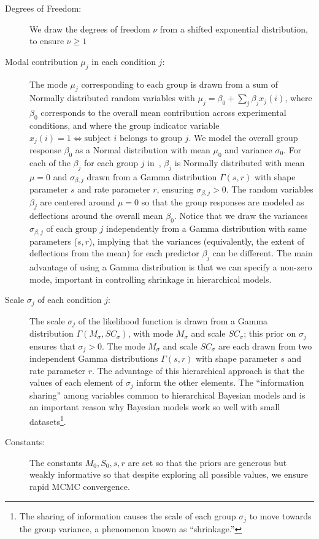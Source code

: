 \begin{description}
    \item[Degrees of Freedom:] We draw the degrees of freedom $\nu$ from a shifted exponential distribution, to ensure $\nu \geq 1$
    \item[Modal contribution $\mu_j$ in each condition $j$:] The mode $\mu_j$ corresponding to each group is drawn from a sum of Normally distributed random variables with $\mu_j = \beta_0 + \sum_j \beta_j x_j(i)$, where $\beta_0$ corresponds to the overall mean contribution across experimental conditions, and where the group indicator variable $x_j(i)=1 \iff \text{subject } i \text{ belongs to group } j$. We model the overall group response $\beta_0$ as a Normal distribution with mean $\mu_0$ and variance $\sigma_0$. For each of the $\beta_j$ for each group $j$ in~, $\beta_j$ is Normally distributed with mean $\mu=0$ and $\sigma_{\beta, j}$ drawn from a Gamma distribution $\Gamma(s,r)$ with shape parameter $s$ and rate parameter $r$, ensuring $\sigma_{\beta, j} > 0$. 
    The random variables $\beta_j$ are centered around $\mu=0$ so that the group responses are modeled as deflections around the overall mean $\beta_0$. Notice that we draw the variances $\sigma_{\beta, j}$ of each group $j$ independently from a Gamma distribution with same parameters ($s,r$), implying that the variances (equivalently, the extent of deflections from the mean) for each predictor $\beta_j$ can be different. The main advantage of using a Gamma distribution is that we can specify a non-zero mode, important in controlling shrinkage in hierarchical models. 
    \item[Scale $\sigma_j$ of each condition $j$:]  The scale $\sigma_j$ of the likelihood function is drawn from a Gamma distribution $\Gamma(M_{\sigma}, SC_{\sigma})$, with mode $M_{\sigma}$ and scale $SC_{\sigma}$; this prior on $\sigma_j$ ensures that $\sigma_j > 0$. The mode $M_{\sigma}$ and scale $SC_{\sigma}$ are each drawn from two independent Gamma distributions $\Gamma(s,r)$ with shape parameter $s$ and rate parameter $r$. The advantage of this hierarchical approach is that the values of each element of $\sigma_j$ inform the other elements. The ``information sharing'' among variables common to hierarchical Bayesian models and is an important reason why Bayesian models work so well with small datasets\footnote{The sharing of information causes the scale of each group $\sigma_{j}$ to move towards the group variance, a phenomenon known as ``shrinkage.'' }.
    \item[Constants:] The constants $M_0, S_0, s, r$ are set so that the priors are generous but weakly informative so that despite exploring all possible values, we ensure rapid MCMC convergence.
\end{description}


